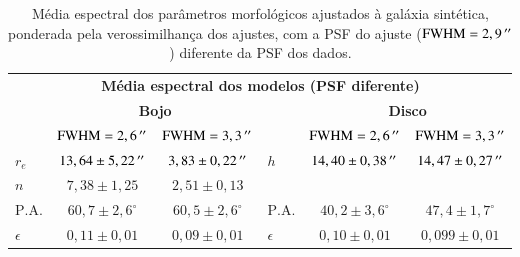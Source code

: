\begin{table}
\begin{tabular}{ l c c  l c c }
  \hline
  \multicolumn{6}{c}{\textbf{Média espectral dos modelos (PSF diferente)}} \\
  & \multicolumn{2}{c}{\textbf{Bojo}} & & \multicolumn{2}{c}{\textbf{Disco}} \\
  & $\mathrm{FWHM} = 2,6\,^{\prime\prime}$ & $\mathrm{FWHM} = 3,3\,^{\prime\prime}$ & &
  $\mathrm{FWHM} = 2,6\,^{\prime\prime}$ & $\mathrm{FWHM} = 3,3\,^{\prime\prime}$ \\
  \hline
  $r_e$ & $13,64 \pm 5,22\,^{\prime\prime}$ & $3,83 \pm 0,22\,^{\prime\prime}$ & $h$ & $14,40
  \pm 0,38\,^{\prime\prime}$ & $14,47 \pm 0,27\,^{\prime\prime}$ \\
  $n$ & $7,38 \pm 1,25$ & $2,51 \pm 0,13$ & & & \\
  $\mathrm{P.A.}$ & $60,7 \pm 2,6^\circ$ & $60,5 \pm
  2,6^\circ$ & $\mathrm{P.A.}$ & $40,2 \pm 3,6^\circ$ & $47,4 \pm
  1,7^\circ$ \\
  $\epsilon$ & $0,11 \pm 0,01$ & $0,09 \pm 0,01$ & $\epsilon$ & $0,10 \pm
  0,01$ & $0,099 \pm 0,01$ \\
  \hline
\end{tabular}
\caption[Parâmetros do ajuste morfológico espectral com PSF diferente]
{Média espectral dos parâmetros morfológicos ajustados à galáxia sintética,
ponderada pela verossimilhança dos ajustes, com a PSF do ajuste ($\mathrm{FWHM}
= 2,9\,^{\prime\prime}$) diferente da PSF dos dados.}
\label{tab:testeAjustePSF}
\end{table}

